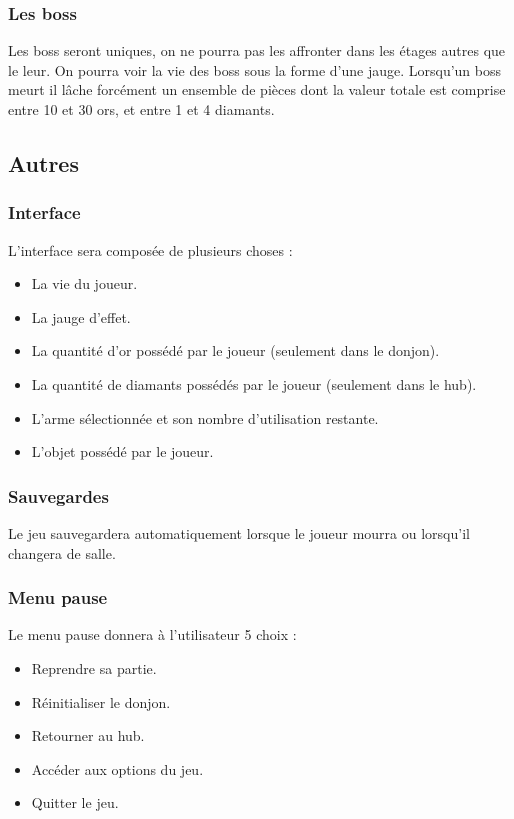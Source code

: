 \documentclass[]{extarticle}
\begin{document}
		\subsubsection{Les boss}
\bigbreak
\bigbreak
Les boss seront uniques, on ne pourra pas les affronter dans les étages autres que le leur.
On pourra voir la vie des boss sous la forme d’une jauge. Lorsqu’un boss meurt il lâche forcément un ensemble de pièces dont la valeur totale est comprise entre 10 et 30 ors, et entre 1 et 4 diamants.
\bigbreak
\newpage
	\subsection{Autres}
		\subsubsection{Interface}
\bigbreak
\bigbreak
L’interface sera composée de plusieurs choses :
\begin{itemize}
\item La vie du joueur.
\item La jauge d’effet.
\item La quantité d’or possédé par le joueur (seulement dans le donjon).
\item La quantité de diamants possédés par le joueur (seulement dans le hub).
\item L’arme sélectionnée et son nombre d’utilisation restante.
\item L’objet possédé par le joueur.
\end{itemize}
\bigbreak

		\subsubsection{Sauvegardes}
\bigbreak
\bigbreak
Le jeu sauvegardera automatiquement lorsque le joueur mourra ou lorsqu’il changera de salle.
\bigbreak

		\subsubsection{Menu pause}
\bigbreak
\bigbreak
Le menu pause donnera à l’utilisateur 5 choix :
\begin{itemize}
\item Reprendre sa partie.
\item Réinitialiser le donjon.
\item Retourner au hub.
\item Accéder aux options du jeu.
\item Quitter le jeu.
\end{itemize}
\end{document}
